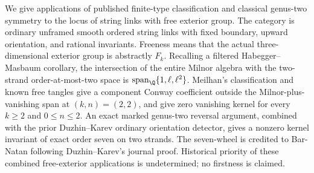 
We give applications of published finite-type classification and classical
genus-two symmetry to the locus of string links with free exterior group.
The category is ordinary unframed smooth ordered string links with fixed
boundary, upward orientation, and rational invariants. Freeness means that
the actual three-dimensional exterior group is abstractly $F_k$.
Recalling a filtered Habegger--Masbaum corollary, the intersection of the
entire Milnor algebra with the two-strand order-at-most-two space is
$\operatorname{span}_{\Q}\{1,\ell,\ell^2\}$.
Meilhan's classification and known free tangles give a component Conway
coefficient outside the Milnor-plus-vanishing span at $(k,n)=(2,2)$, and
give zero vanishing kernel for every $k\geq2$ and $0\leq n\leq2$.
An exact marked genus-two reversal argument, combined with the prior
Duzhin--Karev ordinary orientation detector, gives a nonzero kernel
invariant of exact order seven on two strands.
The seven-wheel is credited to Bar-Natan following Duzhin--Karev's journal
proof. Historical priority of these combined free-exterior applications
is undetermined; no firstness is claimed.
